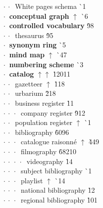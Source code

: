 \begin{tabbing}
$\cdot\:\cdot\:$  White pages schema  \` {\raisebox{.4\height}{\scalebox{.6}{+}}}1\\
$\cdot\:$  \textbf{conceptual graph} $\uparrow$ \` {\raisebox{.4\height}{\scalebox{.6}{+}}}6\\
$\cdot\:$  \textbf{controlled vocabulary}  \` 9{\raisebox{.4\height}{\scalebox{.6}{+}}}8\\
$\cdot\:\cdot\:$  thesaurus  \` 9{\raisebox{.4\height}{\scalebox{.6}{+}}}5\\
$\cdot\:$  \textbf{synonym ring}  \` {\raisebox{.4\height}{\scalebox{.6}{+}}}5\\
$\cdot\:$  \textbf{mind map} $\uparrow$ \` {\raisebox{.4\height}{\scalebox{.6}{+}}}47\\
$\cdot\:$  \textbf{numbering scheme}  \` {\raisebox{.4\height}{\scalebox{.6}{+}}}3\\
$\cdot\:$  \textbf{catalog} $\uparrow\uparrow$ \` 120{\raisebox{.4\height}{\scalebox{.6}{+}}}11\\
$\cdot\:\cdot\:$  gazetteer $\uparrow$ \` 1{\raisebox{.4\height}{\scalebox{.6}{+}}}18\\
$\cdot\:\cdot\:$  urbarium  \` 2{\raisebox{.4\height}{\scalebox{.6}{+}}}18\\
$\cdot\:\cdot\:$  business register  \` 1{\raisebox{.4\height}{\scalebox{.6}{+}}}1\\
$\cdot\:\cdot\:\cdot\:$  company register  \` 9{\raisebox{.4\height}{\scalebox{.6}{+}}}12\\
$\cdot\:\cdot\:$  population register $\uparrow$ \` {\raisebox{.4\height}{\scalebox{.6}{+}}}1\\
$\cdot\:\cdot\:$  bibliography  \` 609{\raisebox{.4\height}{\scalebox{.6}{+}}}6\\
$\cdot\:\cdot\:\cdot\:$  catalogue raisonné $\uparrow$ \` 44{\raisebox{.4\height}{\scalebox{.6}{+}}}9\\
$\cdot\:\cdot\:\cdot\:$  filmography  \` 682{\raisebox{.4\height}{\scalebox{.6}{+}}}10\\
$\cdot\:\cdot\:\cdot\:\cdot\:$  videography  \` 14\\
$\cdot\:\cdot\:\cdot\:$  subject bibliography  \` {\raisebox{.4\height}{\scalebox{.6}{+}}}1\\
$\cdot\:\cdot\:\cdot\:$  playlist $\uparrow$ \` {\raisebox{.4\height}{\scalebox{.6}{+}}}14\\
$\cdot\:\cdot\:\cdot\:$  national bibliography  \` 1{\raisebox{.4\height}{\scalebox{.6}{+}}}2\\
$\cdot\:\cdot\:\cdot\:$  regional bibliography  \` 10{\raisebox{.4\height}{\scalebox{.6}{+}}}1\\

\end{tabbing}
